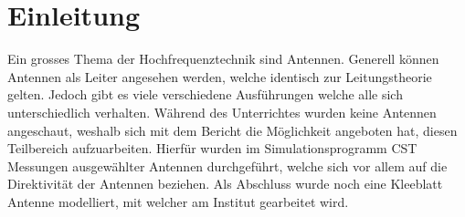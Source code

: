 \section{Einleitung}

Ein grosses Thema der Hochfrequenztechnik sind Antennen. Generell können Antennen als Leiter angesehen werden, welche identisch zur Leitungstheorie gelten. Jedoch gibt es viele verschiedene Ausführungen welche alle sich unterschiedlich verhalten. Während des Unterrichtes wurden keine Antennen angeschaut, weshalb sich mit dem Bericht die Möglichkeit angeboten hat, diesen Teilbereich aufzuarbeiten. Hierfür wurden im Simulationsprogramm CST Messungen ausgewählter Antennen durchgeführt, welche sich vor allem auf die Direktivität der Antennen beziehen. Als Abschluss wurde noch eine Kleeblatt Antenne modelliert, mit welcher am Institut gearbeitet wird. 